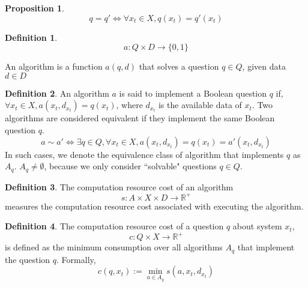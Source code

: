 \documentclass[11pt,a4paper]{article}
\newtheorem{pro}{Proposition}[section]
\theoremstyle{definition}
\newtheorem{defn}{Definition}[section]
\theoremstyle{remark}
\numberwithin{equation}{section}
\begin{document}
\begin{pro}
\begin{equation}
q=q' \iff  \forall x_t \in X, q(x_t) = q'(x_t)
\end{equation}
\end{pro}

\begin{defn}
\begin{equation}
a: Q \times D \rightarrow \{0, 1\}
\end{equation}

An algorithm is a function $a(q,d)$ that solves a question $q\in Q$, given data $d \in D$
\end{defn}
\begin{defn}
An algorithm \( a \) is said to implement a Boolean question \( q \) if, $\forall  x_t \in X , a(x_t, d_{x_t}) = q(x_t) $, where $d_{x_t}$ is the available data of $x_t$.
Two algorithms are considered equivalent if they implement the same Boolean question $q$. 
\begin{equation}
a \sim a' \iff  
\exists q\in Q, \forall  x_t \in X , a(x_t, d_{x_t}) = q(x_t)  =a'(x_t, d_{x_t})
\end{equation}
In such cases, we denote the equivalence class of algorithm that implements $q$ as \( A_q \).
$A_q \neq \emptyset$, because we only consider ``solvable" questions $q\in Q$. 

\end{defn}

\begin{defn}
The computation resource cost of an algorithm 
\begin{equation}
s: A \times X \times D  \rightarrow \mathbb{R}^+ 
\end{equation}
 measures the computation resource cost associated with executing the algorithm.
 \end{defn}




\begin{defn}
The computation resource cost of a question $q$ about system $x_t$,
\begin{equation}
c: Q \times X  \rightarrow \mathbb{R}^+ 
\end{equation}
is defined as the minimum consumption over all algorithms \( A_q \) that implement the question \( q \).
Formally, 
\begin{equation}
 c(q,x_t)  := \min_{a \in A_q } s(a,x_t,d_{x_t}) 
\end{equation}

\end{defn}
\end{document}
